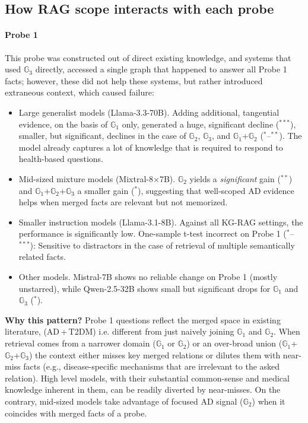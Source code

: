 \subsection{How RAG scope interacts with each probe}

\paragraph{Probe 1}
This probe was constructed out of direct existing knowledge, and systems that used $\mathbb{G}_3$ directly, accessed a single graph that happened to answer all Probe 1 facts; however, these did not help these systems, but rather introduced extraneous context, which caused failure:
\begin{itemize}
  \item Large generalist models (Llama-3.3-70B). Adding additional, tangential evidence, on the basis of $\mathbb{G}_1$ only, generated a huge, significant decline ($^{***}$), smaller, but significant, declines in the case of $\mathbb{G}_2$, $\mathbb{G}_3$, and $\mathbb{G}_1$+$\mathbb{G}_2$ ($^{*}$–$^{**}$). The model already captures a lot of knowledge that is required to respond to health-based questions.
  \item Mid-sized mixture models (Mixtral-8$\times$7B). $\mathbb{G}_2$ yields a \emph{significant} gain ($^{**}$) and $\mathbb{G}_1$+$\mathbb{G}_2$+$\mathbb{G}_3$ a smaller gain ($^{*}$), suggesting that well-scoped AD evidence helps when merged facts are relevant but not memorized.
  \item Smaller instruction models (Llama-3.1-8B). Against all KG-RAG settings, the performance is significantly low. One-sample t-test incorrect on Probe 1 ($^{*}$–$^{***}$): Sensitive to distractors in the case of retrieval of multiple semantically related facts.
  \item Other models. Mistral-7B shows no reliable change on Probe 1 (mostly unstarred), while Qwen-2.5-32B shows small but significant drops for $\mathbb{G}_1$ and $\mathbb{G}_3$ ($^{*}$).
\end{itemize}

\textbf{Why this pattern?}
Probe 1 questions reflect the merged space in existing literature, (AD\,+\,T2DM) i.e. different from just naively joining $\mathbb{G}_1$ and  $\mathbb{G}_2$. When retrieval comes from a narrower domain ($\mathbb{G}_1$ or $\mathbb{G}_2$) or an over-broad union ($\mathbb{G}_1$+$\mathbb{G}_2$+$\mathbb{G}_3$) the context either {misses} key merged relations or {dilutes} them with near-miss facts (e.g., disease-specific mechanisms that are irrelevant to the asked relation). High level models, with their substantial common-sense and medical knowledge inherent in them, can be readily diverted by near-misses. On the contrary, mid-sized models take advantage of focused AD signal ($\mathbb{G}_2$) when it coincides with merged facts of a probe.

